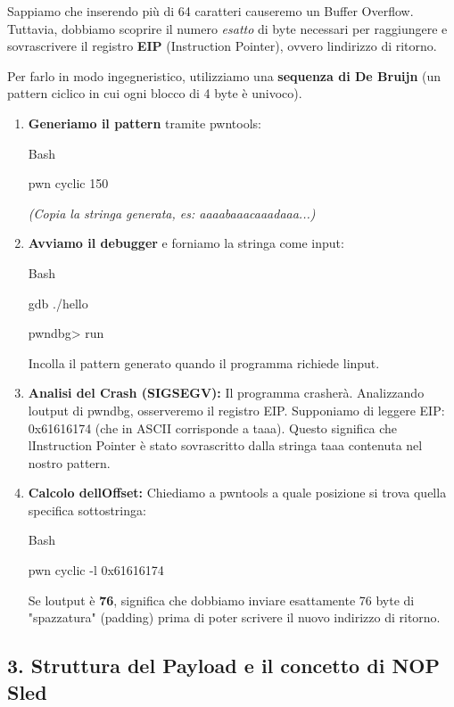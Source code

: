 \documentclass[11pt,a4paper]{article}
\begin{document}
Sappiamo che inserendo più di 64 caratteri causeremo un Buffer Overflow.
Tuttavia, dobbiamo scoprire il numero \emph{esatto} di byte necessari
per raggiungere e sovrascrivere il registro \textbf{EIP} (Instruction
Pointer), ovvero l\textquotesingle indirizzo di ritorno.

Per farlo in modo ingegneristico, utilizziamo una \textbf{sequenza di De
Bruijn} (un pattern ciclico in cui ogni blocco di 4 byte è univoco).

\begin{enumerate}
\def\labelenumi{\arabic{enumi}.}
\item
  \textbf{Generiamo il pattern} tramite pwntools:

  Bash

  pwn cyclic 150

  \emph{(Copia la stringa generata, es: aaaabaaacaaadaaa...)}
\item
  \textbf{Avviamo il debugger} e forniamo la stringa come input:

  Bash

  gdb ./hello

  pwndbg\textgreater{} run

  Incolla il pattern generato quando il programma richiede
  l\textquotesingle input.
\item
  \textbf{Analisi del Crash (SIGSEGV):} Il programma crasherà.
  Analizzando l\textquotesingle output di pwndbg, osserveremo il
  registro EIP. Supponiamo di leggere EIP: 0x61616174 (che in ASCII
  corrisponde a taaa). Questo significa che
  l\textquotesingle Instruction Pointer è stato sovrascritto dalla
  stringa taaa contenuta nel nostro pattern.
\item
  \textbf{Calcolo dell\textquotesingle Offset:} Chiediamo a pwntools a
  quale posizione si trova quella specifica sottostringa:

  Bash

  pwn cyclic -l 0x61616174

  Se l\textquotesingle output è \textbf{76}, significa che dobbiamo
  inviare esattamente 76 byte di "spazzatura" (padding) prima di poter
  scrivere il nuovo indirizzo di ritorno.
\end{enumerate}

\subsection{3. Struttura del Payload e il concetto di NOP
Sled}\label{struttura-del-payload-e-il-concetto-di-nop-sled}
\end{document}
